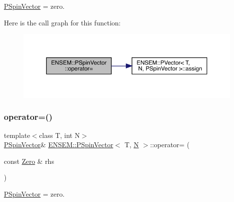 \mbox{\hyperlink{classENSEM_1_1PSpinVector}{P\+Spin\+Vector}} = zero. 

Here is the call graph for this function\+:
\nopagebreak
\begin{figure}[H]
\begin{center}
\leavevmode
\includegraphics[width=350pt]{d0/dce/classENSEM_1_1PSpinVector_aff99857da5f6f68093f04c9df5355e84_cgraph}
\end{center}
\end{figure}
\mbox{\label{classENSEM_1_1PSpinVector_aff99857da5f6f68093f04c9df5355e84}} 
\subsubsection{\texorpdfstring{operator=()}{operator=()}\hspace{0.1cm}{\footnotesize\ttfamily [2/4]}}
{\footnotesize\ttfamily template$<$class T, int N$>$ \\
\mbox{\hyperlink{classENSEM_1_1PSpinVector}{P\+Spin\+Vector}}\& \mbox{\hyperlink{classENSEM_1_1PSpinVector}{E\+N\+S\+E\+M\+::\+P\+Spin\+Vector}}$<$ T, \mbox{\hyperlink{operator__name__util_8cc_a7722c8ecbb62d99aee7ce68b1752f337}{N}} $>$\+::operator= (\begin{DoxyParamCaption}\item[{const \mbox{\hyperlink{structENSEM_1_1Zero}{Zero}} \&}]{rhs }\end{DoxyParamCaption})\hspace{0.3cm}{\ttfamily [inline]}}



\mbox{\hyperlink{classENSEM_1_1PSpinVector}{P\+Spin\+Vector}} = zero. 

